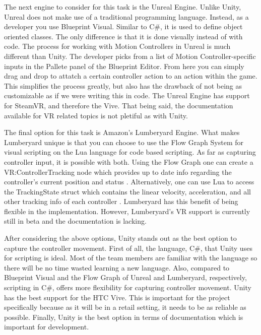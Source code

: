 \documentclass[10pt,journal,compsoc,onecolumn, draftclsnofoot]{IEEEtran}
\begin{document}
The next engine to consider for this task is the Unreal Engine.
Unlike Unity, Unreal does not make use of a traditional programming language.
Instead, as a developer you use Blueprint Visual.
Similar to C\#, it is used to define object oriented classes.
The only difference is that it is done visually instead of with code.
The process for working with Motion Controllers in Unreal is much different than Unity.
The developer picks from a list of Motion Controller-specific inputs in the Pallete panel of the Blueprint Editor\cite{unreal_controller}.
From here you can simply drag and drop to attatch a certain controller action to an action within the game.
This simplifies the process greatly, but also has the drawback of not being as customizable as if we were writing this in code.
The Unreal Engine has support for SteamVR, and therefore the Vive.
That being said, the documentation available for VR related topics is not pletiful as with Unity.

The final option for this task is Amazon's Lumberyard Engine.
What makes Lumberyard unique is that you can choose to use the Flow Graph System for visual scripting on the Lua language for code based scripting.
As far as capturing controller input, it is possible with both.
Using the Flow Graph one can create a VR:ControllerTracking node which provides up to date info regarding the controller's current position and status \cite{lumberyard_controller_flow}.
Alternatively, one can use Lua to access the TrackingState struct which contains the linear velocity, acceleration, and all other tracking info of each controller \cite{lumberyard_controller_lua}.
Lumberyard has this benefit of being flexible in the implementation.
However, Lumberyard's VR support is currently still in beta and the documentation is lacking.

After considering the above options, Unity stands out as the best option to capture the controller movement.
First of all, the language, C\#, that Unity uses for scripting is ideal.
Most of the team members are familiar with the language so there will be no time wasted learning a new language.
Also, compared to Blueprint Visual and the Flow Graph of Unreal and Lumberyard, respectively, scripting in C\#, offers more flexibility for capturing controller movement.
Unity has the best support for the HTC Vive.
This is important for the project specifically because as it will be in a retail setting, it needs to be as reliable as possible.
Finally, Unity is the best option in terms of documentation which is important for development.
\end{document}
